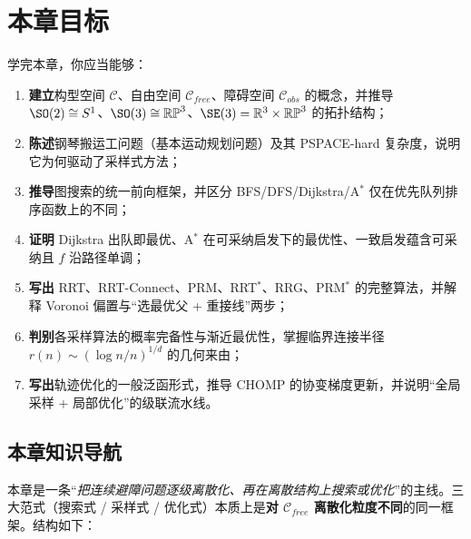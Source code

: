 \section*{本章目标}
学完本章，你应当能够：
\begin{enumerate}
  \item \textbf{建立}构型空间 $\mathcal{C}$、自由空间 $\mathcal{C}_{free}$、障碍空间 $\mathcal{C}_{obs}$ 的概念，并推导 $\SO(2)\cong S^1$、$\SO(3)\cong\mathbb{RP}^3$、$\SE(3)=\mathbb{R}^3\times\mathbb{RP}^3$ 的拓扑结构；
  \item \textbf{陈述}钢琴搬运工问题（基本运动规划问题）及其 PSPACE-hard 复杂度，说明它为何驱动了采样式方法；
  \item \textbf{推导}图搜索的统一前向框架，并区分 BFS/DFS/Dijkstra/A$^*$ 仅在优先队列排序函数上的不同；
  \item \textbf{证明} Dijkstra 出队即最优、A$^*$ 在可采纳启发下的最优性、一致启发蕴含可采纳且 $f$ 沿路径单调；
  \item \textbf{写出} RRT、RRT-Connect、PRM、RRT$^*$、RRG、PRM$^*$ 的完整算法，并解释 Voronoi 偏置与“选最优父 + 重接线”两步；
  \item \textbf{判别}各采样算法的概率完备性与渐近最优性，掌握临界连接半径 $r(n)\sim(\log n/n)^{1/d}$ 的几何来由；
  \item \textbf{写出}轨迹优化的一般泛函形式，推导 CHOMP 的协变梯度更新，并说明“全局采样 + 局部优化”的级联流水线。
\end{enumerate}

\subsection*{本章知识导航}
本章是一条“\emph{把连续避障问题逐级离散化、再在离散结构上搜索或优化}”的主线。三大范式（搜索式 / 采样式 / 优化式）本质上是\textbf{对 $\mathcal{C}_{free}$ 离散化粒度不同}的同一框架。结构如下：

